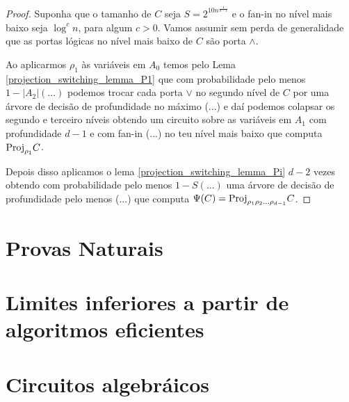 \begin{proof}

Suponha que o tamanho de $C$ seja $S = 2^{10n^{\frac{1}{d - 1}}}$ e o fan-in no nível mais baixo seja $\log^{c} n$, para algum $c > 0$. Vamos assumir sem perda de generalidade que as portas lógicas no nível mais baixo de $C$ são porta $\land$.

Ao aplicarmos $\rho_{1}$ às variáveis em $A_{0}$ temos pelo Lema \ref{projection_switching_lemma_P1} que com probabilidade pelo menos $1 - \lvert A_{2} \rvert (...)$ podemos trocar cada porta $\lor$ no segundo nível de $C$ por uma árvore de decisão de profundidade no máximo (...) e daí podemos colapsar os segundo e terceiro níveis obtendo um circuito sobre as variáveis em $A_{1}$ com profundidade $d - 1$ e com fan-in (...) no teu nível mais baixo que computa $\text{Proj}_{\rho_1}C$.

Depois disso aplicamos o lema \ref{projection_switching_lemma_Pi} $d - 2$ vezes obtendo com probabilidade pelo menos $1 - S(...)$ uma árvore de decisão de profundidade pelo menos (...) que computa $\Psi(C) = \text{Proj}_{\rho_{1}\rho_{2}\dots\rho_{d - 1}}C$.

\end{proof}

\section{Provas Naturais}

\section{Limites inferiores a partir de algoritmos eficientes}

\section{Circuitos algebráicos}